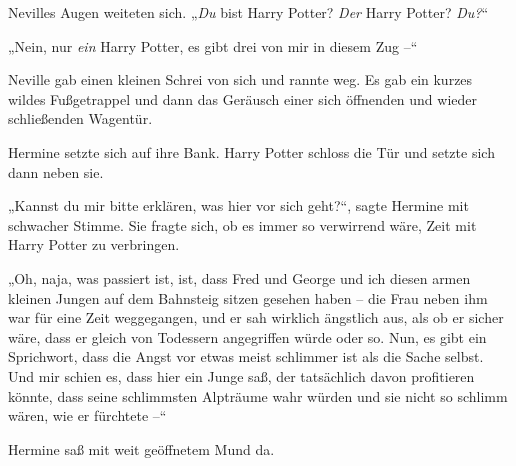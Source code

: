 Nevilles Augen weiteten sich. „\emph{Du} bist Harry Potter? \emph{Der} Harry Potter? \emph{Du?}“

„Nein, nur \emph{ein} Harry Potter, es gibt drei von mir in diesem Zug –“

Neville gab einen kleinen Schrei von sich und rannte weg. Es gab ein kurzes wildes Fußgetrappel und dann das Geräusch einer sich öffnenden und wieder schließenden Wagentür.

Hermine setzte sich auf ihre Bank. Harry Potter schloss die Tür und setzte sich dann neben sie.

„Kannst du mir bitte erklären, was hier vor sich geht?“, sagte Hermine mit schwacher Stimme. Sie fragte sich, ob es immer so verwirrend wäre, Zeit mit Harry Potter zu verbringen.

„Oh, naja, was passiert ist, ist, dass Fred und George und ich diesen armen kleinen Jungen auf dem Bahnsteig sitzen gesehen haben – die Frau neben ihm war für eine Zeit weggegangen, und er sah wirklich ängstlich aus, als ob er sicher wäre, dass er gleich von Todessern angegriffen würde oder so. Nun, es gibt ein Sprichwort, dass die Angst vor etwas meist schlimmer ist als die Sache selbst. Und mir schien es, dass hier ein Junge saß, der tatsächlich davon profitieren könnte, dass seine schlimmsten Alpträume wahr würden und sie nicht so schlimm wären, wie er fürchtete –“

Hermine saß mit weit geöffnetem Mund da.

